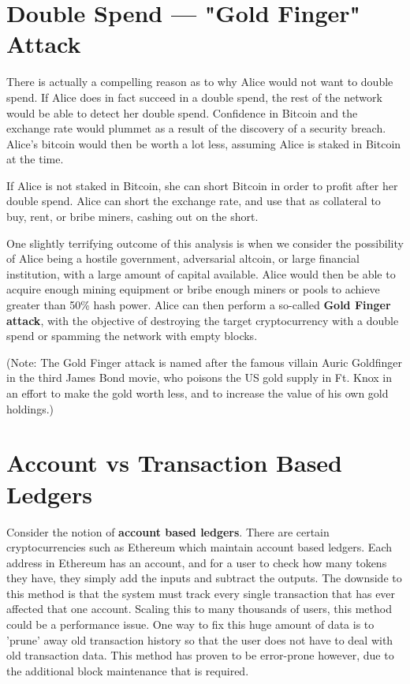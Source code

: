 \documentclass[full.tex]{subfiles}
\begin{document}
    \section*{Double Spend --- "Gold Finger" Attack}
    
    There is actually a compelling reason as to why Alice would not want to double spend. If Alice does in fact succeed in a double spend, the rest of the network would be able to detect her double spend. Confidence in Bitcoin and the exchange rate would plummet as a result of the discovery of a security breach. Alice's bitcoin would then be worth a lot less, assuming Alice is staked in Bitcoin at the time. 
    
    If Alice is not staked in Bitcoin, she can short Bitcoin in order to profit after her double spend. Alice can short the exchange rate, and use that as collateral to buy, rent, or bribe miners, cashing out on the short.
    
    One slightly terrifying outcome of this analysis is when we consider the possibility of Alice being a hostile government, adversarial altcoin, or large financial institution, with a large amount of capital available. Alice would then be able to acquire enough mining equipment or bribe enough miners or pools to achieve greater than 50\% hash power. Alice can then perform a so-called \textbf{Gold Finger attack}, with the objective of destroying the target cryptocurrency with a double spend or spamming the network with empty blocks.
    
    (Note: The Gold Finger attack is named after the famous villain Auric Goldfinger in the third James Bond movie, who poisons the US gold supply in Ft. Knox in an effort to make the gold worth less, and to increase the value of his own gold holdings.)
    
    \section*{Account vs Transaction Based Ledgers}
    
    Consider the notion of \textbf{account based ledgers}. There are certain cryptocurrencies such as Ethereum which maintain account based ledgers. Each address in Ethereum has an account, and for a user to check how many tokens they have, they simply add the inputs and subtract the outputs. The downside to this method is that the system must track every single transaction that has ever affected that one account. Scaling this to many thousands of users, this method could be a performance issue. One way to fix this huge amount of data is to 'prune' away old transaction history so that the user does not have to deal with old transaction data. This method has proven to be error-prone however, due to the additional block maintenance that is required. 
    
\end{document}
